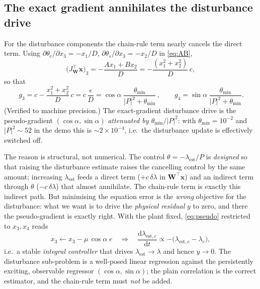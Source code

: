 \documentclass[11pt]{article}
\newcommand{\vx}{\mathbf{x}}
\newcommand{\vW}{\mathbf{W}}
\begin{document}
\subsection{The exact gradient annihilates the disturbance drive}
\label{sec:g3}

For the disturbance components the chain-rule term nearly cancels the
direct term. Using $\partial\theta_c/\partial x_3=-x_1/D$,
$\partial\theta_s/\partial x_3=-x_2/D$ in \eqref{eq:AB},
\begin{equation}
  \big(J_{\!\vW}^{\top}\vx\big)_3
    = -\frac{A x_1 + B x_2}{D}
    = -\frac{(x_1^2+x_2^2)}{D}\,c,
\end{equation}
so that
\begin{equation}
  \boxed{\,g_3 = c - \frac{x_1^2+x_2^2}{D}\,c
        = c\,\frac{\epsilon}{D}
        = \cos\alpha\;\frac{\theta_{\min}}{|P|^2+\theta_{\min}}\,,}
  \qquad
  g_4 = \sin\alpha\;\frac{\theta_{\min}}{|P|^2+\theta_{\min}} .
  \label{eq:g3}
\end{equation}
(Verified to machine precision.) The exact-gradient disturbance drive is
the pseudo-gradient $(\cos\alpha,\sin\alpha)$ \emph{attenuated by
$\theta_{\min}/|P|^2$}: with $\theta_{\min}=10^{-2}$ and $|P|^2\!\sim\!52$
in the demo this is $\sim\!2\times10^{-4}$, i.e.\ the disturbance update is
effectively switched off.

The reason is structural, not numerical. The control
$\theta=-\lambda_{\text{est}}/P$ is \emph{designed} so that raising the
disturbance estimate raises the cancelling control by the same amount;
increasing $\lambda_{\text{est}}$ feeds a direct term ($+c\,\delta\lambda$
in $\vW^{\!\top}\vx$) and an indirect term through $\theta$
($-c\,\delta\lambda$) that almost annihilate. The chain-rule term is
exactly this indirect path. But minimising the equation error is the
\emph{wrong} objective for the disturbance: what we want is to drive the
\emph{physical residual} $y$ to zero, and there the pseudo-gradient is
exactly right. With the plant fixed, \eqref{eq:pseudo} restricted to
$x_3,x_4$ reads
\begin{equation}
  x_3 \leftarrow x_3 - \mu\,\cos\alpha\; e
  \quad\Longrightarrow\quad
  \frac{\mathrm d\lambda_{\text{est},c}}{\mathrm dt}
    \propto -\big(\lambda_{\text{est},c}-\lambda_c\big),
\end{equation}
i.e.\ a stable \emph{integral controller} that drives
$\lambda_{\text{est}}\!\to\!\lambda$ and hence $y\!\to\!0$. The disturbance
sub-problem is a well-posed linear regression against the persistently
exciting, observable regressor $(\cos\alpha,\sin\alpha)$; the plain
correlation is the correct estimator, and the chain-rule term must
\emph{not} be added.
\end{document}
